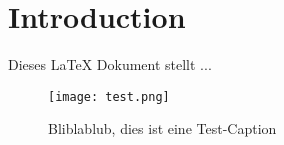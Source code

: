 \section{Introduction}
\label{sec:Introduction}

Dieses LaTeX Dokument stellt ... \cite{image-to-image-ccan}
\\

\begin{figure}[h]
\centering
\texttt{[image: test.png]}
\caption{Bliblablub, dies ist eine Test-Caption}
\end{figure}
